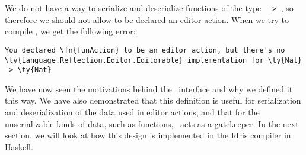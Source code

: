 We do not have a way to serialize and deserialize functions of the type
\texttt{ -> }, so therefore we should not allow 
to be declared an editor action.
When we try to compile , we get the following error:

\begin{Verbatim}[framesep=2mm, label=\footnotesize{\normalfont{Idris error message}}, labelposition=topline]
You declared \fn{funAction} to be an editor action, but there's no
\ty{Language.Reflection.Editor.Editorable} implementation for \ty{Nat} -> \ty{Nat}
\end{Verbatim}

We have now seen the motivations behind the \Editorable\ interface and
why we defined it this way. We have also demonstrated that this definition
is useful for serialization and deserialization of the data used in editor
actions, and that for the unserializable kinds of data, such as functions,
\Editorable\ acts as a gatekeeper. In the next section, we will look at how
this design is implemented in the Idris compiler in Haskell.
